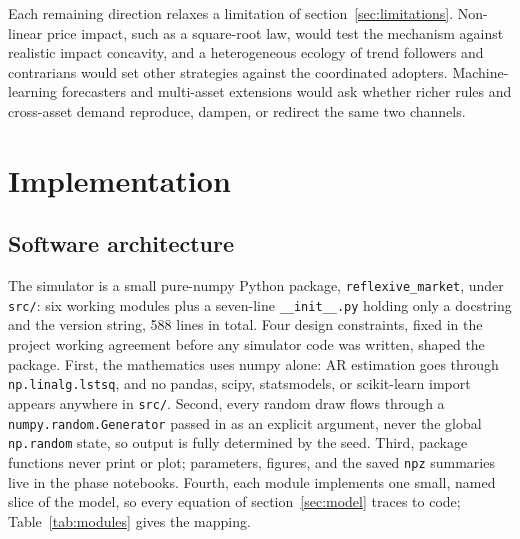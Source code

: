 \documentclass[12pt]{article}
\begin{document}
Each remaining direction relaxes a limitation of section~\ref{sec:limitations}. Non-linear price impact, such as a square-root law, would test the mechanism against realistic impact concavity, and a heterogeneous ecology of trend followers and contrarians would set other strategies against the coordinated adopters. %
Machine-learning forecasters and multi-asset extensions would ask whether richer rules and cross-asset demand reproduce, dampen, or redirect the same two channels. %


\clearpage



\clearpage
\appendix

\section{Implementation}\label{app:implementation}

\subsection{Software architecture}\label{sec:software-architecture}

The simulator is a small pure-numpy Python package, \texttt{reflexive\_market}, under \texttt{src/}: six working modules plus a seven-line \texttt{\_\_init\_\_.py} holding only a docstring and the version string, 588 lines in total. %
Four design constraints, fixed in the project working agreement before any simulator code was written, shaped the package. %
First, the mathematics uses numpy alone: AR estimation goes through \texttt{np.linalg.lstsq}, and no pandas, scipy, statsmodels, or scikit-learn import appears anywhere in \texttt{src/}. Second, every random draw flows through a \texttt{numpy.random.Generator} passed in as an explicit argument, never the global \texttt{np.random} state, so output is fully determined by the seed. Third, package functions never print or plot; parameters, figures, and the saved \texttt{npz} summaries live in the phase notebooks. Fourth, each module implements one small, named slice of the model, so every equation of section~\ref{sec:model} traces to code; Table~\ref{tab:modules} gives the mapping. %
\end{document}
